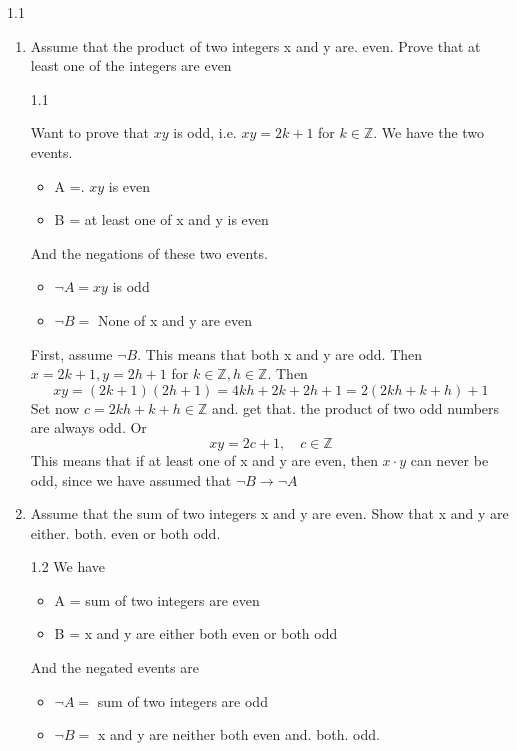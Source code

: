 \documentclass[a4paper,norsk]{article}
\begin{document}
\begin{oppgavebox}{1.1}{}
  \begin{enumerate}
    \item Assume that the product of two integers x and y are. even. Prove that at least one of the integers are even
  \begin{proofbox}{1.1}{}

  Want to prove that $ xy $  is odd, i.e. $ xy = 2k+1 $ for $ k \in \mathbb{Z} $. We have the two events. 
  \begin{itemize}
    \item A =. $ xy $ is even
    \item B = at least one of x and y is even
  \end{itemize}
  And the negations of these two events.
  \begin{itemize}
    \item $ \neg A = xy $ is odd
    \item $ \neg B = $ None of x and y are even
  \end{itemize}

  First, assume $ \neg B $. This means that both x and y are odd. Then $ x = 2k+1, y = 2h+1 $  for $ k \in \mathbb{Z}, h \in \mathbb{Z} $. Then
  \[
      xy = \left( 2k+1 \right) \left( 2h+1 \right) = 4kh + 2k +2h+1 = 2 \left( 2kh + k + h \right) + 1
  \]
  Set now $ c = 2kh + k + h \in \mathbb{Z} $ and. get that. the product of two odd numbers are always odd. Or
  \[
      xy = 2c+1,\quad c \in \mathbb{Z}
  \]
  This means that if at least one of x and y are even, then $ x\cdot y $ can never be odd, since we have assumed that $ \neg B \rightarrow \neg A $ 
    
  \end{proofbox}
  \item Assume that the sum of two integers x and y are even. Show that x and y are either. both. even or both odd.
  \begin{proofbox}{1.2}{}
    We have 
    \begin{itemize}
      \item A = sum of two integers are even
      \item B = x and y are either both even or both odd
    \end{itemize}

    And the negated events are 
    \begin{itemize}
      \item $ \neg A =  $ sum of two integers are odd
      \item $ \neg B =  $ x and y are neither both even and. both. odd.
    \end{itemize}


\end{proofbox}
\end{enumerate}
\end{oppgavebox}
\end{document}
